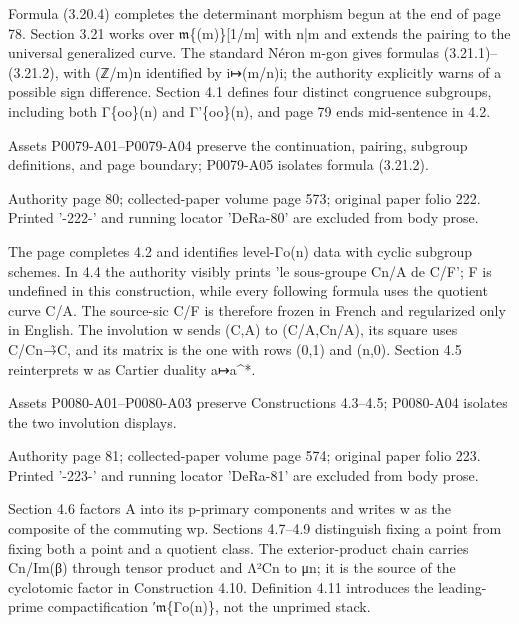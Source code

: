 \documentclass[11pt,a4paper]{article}
\begin{document}
Formula (3.20.4) completes the determinant morphism begun at the end of page 78. Section 3.21 works over \ensuremath{\mathfrak{m}}\textunderscore{}\{(m)\}[1/m] with n|m and extends the pairing to the universal generalized curve. The standard Néron m-gon gives formulas (3.21.1)--(3.21.2), with (ℤ/m)\textunderscore{}n identified by i↦(m/n)i; the authority explicitly warns of a possible sign difference. Section 4.1 defines four distinct congruence subgroups, including both Γ\textunderscore{}\{oo\}(n) and Γ'\textunderscore{}\{oo\}(n), and page 79 ends mid-sentence in 4.2.

Assets P0079-A01--P0079-A04 preserve the continuation, pairing, subgroup definitions, and page boundary; P0079-A05 isolates formula (3.21.2).


\par\medskip
\hypertarget{D018-P0080}{}
\par\smallskip
Authority page 80; collected-paper volume page 573; original paper folio 222. Printed '-222-' and running locator 'DeRa-80' are excluded from body prose.

The page completes 4.2 and identifies level-Γ\textunderscore{}o(n) data with cyclic subgroup schemes. In 4.4 the authority visibly prints 'le sous-groupe C\textunderscore{}n/A de C/F'; F is undefined in this construction, while every following formula uses the quotient curve C/A. The source-sic C/F is therefore frozen in French and regularized only in English. The involution w sends (C,A) to (C/A,C\textunderscore{}n/A), its square uses C/C\textunderscore{}n→̃C, and its matrix is the one with rows (0,1) and (n,0). Section 4.5 reinterprets w as Cartier duality a↦a\textasciicircum{}*.

Assets P0080-A01--P0080-A03 preserve Constructions 4.3--4.5; P0080-A04 isolates the two involution displays.


\par\medskip
\hypertarget{D018-P0081}{}
\par\smallskip
Authority page 81; collected-paper volume page 574; original paper folio 223. Printed '-223-' and running locator 'DeRa-81' are excluded from body prose.

Section 4.6 factors A into its p-primary components and writes w as the composite of the commuting w\textunderscore{}p. Sections 4.7--4.9 distinguish fixing a point from fixing both a point and a quotient class. The exterior-product chain carries C\textunderscore{}n/Im(β) through tensor product and Λ²C\textunderscore{}n to μ\textunderscore{}n; it is the source of the cyclotomic factor in Construction 4.10. Definition 4.11 introduces the leading-prime compactification ′\ensuremath{\mathfrak{m}}\textunderscore{}\{Γ\textunderscore{}o(n)\}, not the unprimed stack.
\end{document}
